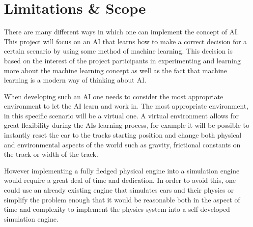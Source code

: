 





\chapter{Limitations \& Scope}
There are many different ways in which one can implement the concept of AI. This project will focus on an AI that learns how to make a correct decision for a certain scenario by using some method of machine learning. This decision is based on the interest of the project participants in experimenting and learning more about the machine learning concept as well as the fact that machine learning is a modern way of thinking about AI.

When developing such an AI one needs to consider the most appropriate environment to let the AI learn and work in. The most appropriate environment, in this specific scenario will be a virtual one. A virtual environment allows for great flexibility during the AIs learning process, for example it will be possible to instantly reset the car to the tracks starting position and change both physical and environmental aspects of the world such as gravity, frictional constants on the track or width of the track.

However implementing a fully fledged physical engine into a simulation engine would require a great deal of time and dedication. In order to avoid this, one could use an already existing engine that simulates cars and their physics or simplify the problem enough that it would be reasonable both in the aspect of time and complexity to implement the physics system into a self developed simulation engine.

